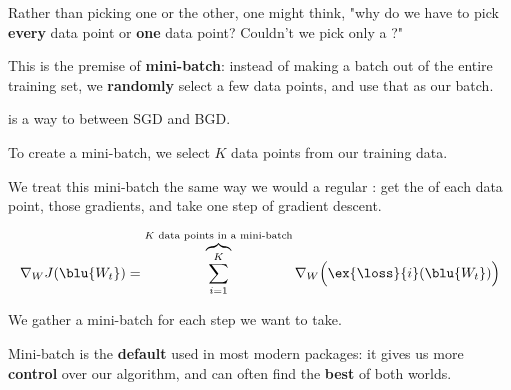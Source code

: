             Rather than picking one or the other, one might think, "why do we have to pick \textbf{every} data point or \textbf{one} data point? Couldn't we pick only a ?"
            
            This is the premise of \textbf{mini-batch}: instead of making a batch out of the entire training set, we \textbf{randomly} select a few data points, and use that as our batch.\\
            
            \begin{definition}
                 is a way to  between SGD and BGD.
                
                To create a mini-batch, we  select $K$ data points from our training data. 
                
                We treat this mini-batch the same way we would a regular : get the  of each data point,  those gradients, and take one  step of gradient descent.
                
                \begin{equation*}
                    \nabla_W J ( \blu{ W_t } )
                    =
                    \overbrace{
                        \sum_{i=1}^K
                    }^{K \text{ data points in a mini-batch}} 
                    \nabla_W
                    \Big(
                        \ex{\loss}{i}(\blu{ W_t })
                    \Big)
                \end{equation*}
                
                We gather a  mini-batch for each step we want to take.
            \end{definition}
            
            Mini-batch is the \textbf{default} used in most modern packages: it gives us more \textbf{control} over our algorithm, and can often find the \textbf{best} of both worlds.
                \\
            
